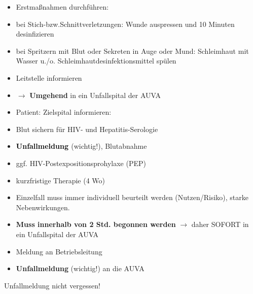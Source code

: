 \documentclass{article}
\newcommand\gEs[1]{\textbf{\textcolor[rgb]{0.0,0.0,0.5019608}{#1}}}
\newcommand\gEs[1]{\textbf{\textcolor[rgb]{0.0,0.0,0.5019608}{#1}}}
\newcommand\gCa[1]{\textbf{\textcolor{black}{#1}}}
\begin{document}
\begin{itemize}
\item {\mdseries
Erstma{\ss}nahmen durchf\"uhren: }

\end{itemize}
\begin{itemize}
\item {\mdseries
bei Stich-bzw.Schnittverletzungen: Wunde auspressen und 10 Minuten
desinfizieren}

\item {\mdseries
bei Spritzern mit Blut oder Sekreten in Auge oder Mund: Schleimhaut mit
Wasser u./o. Schleimhautdesinfektionsmittel sp\"ulen}

\end{itemize}
\begin{itemize}
\item {\mdseries
Leitstelle informieren}

\item {\mdseries
${\rightarrow}$ \gEs{Umgehend} in ein Unfallspital
der AUVA}

\item {\mdseries
Patient: Zielspital informieren:}

\end{itemize}
\begin{itemize}
\item {\mdseries
Blut sichern f\"ur HIV- und Hepatitis-Serologie}

\end{itemize}
\begin{itemize}
\item {\mdseries
\gCa{ Unfallmeldung } (wichtig!), Blutabnahme }

\item {\mdseries
ggf. HIV-Postexpositionsprohylaxe (PEP)}

\end{itemize}
\begin{itemize}
\item {\mdseries
kurzfristige Therapie (4 Wo) }

\item {\mdseries
Einzelfall muss immer individuell beurteilt werden (Nutzen/Risiko),
starke Nebenwirkungen.}

\item {\mdseries
\gEs{Muss innerhalb von 2 Std. begonnen werden}
${\rightarrow}$ daher SOFORT in ein Unfallspital der AUVA}

\end{itemize}
\begin{itemize}
\item {\mdseries
Meldung an Betriebsleitung}

\item {\mdseries
\gEs{Unfallmeldung} (wichtig!) an die AUVA}

\end{itemize}
{\mdseries\color{black}
Unfallmeldung nicht vergessen!}
\end{document}
